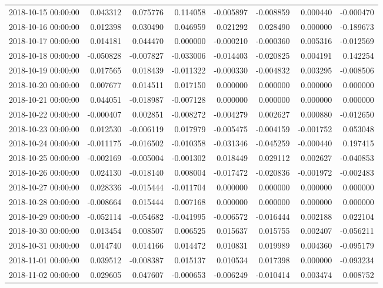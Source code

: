 \begin{tabular}{lrrrrrrr}
2018-10-15 00:00:00 & 0.043312 & 0.075776 & 0.114058 & -0.005897 & -0.008859 & 0.000440 & -0.000470 \\
2018-10-16 00:00:00 & 0.012398 & 0.030490 & 0.046959 & 0.021292 & 0.028490 & 0.000000 & -0.189673 \\
2018-10-17 00:00:00 & 0.014181 & 0.044470 & 0.000000 & -0.000210 & -0.000360 & 0.005316 & -0.012569 \\
2018-10-18 00:00:00 & -0.050828 & -0.007827 & -0.033006 & -0.014403 & -0.020825 & 0.004191 & 0.142254 \\
2018-10-19 00:00:00 & 0.017565 & 0.018439 & -0.011322 & -0.000330 & -0.004832 & 0.003295 & -0.008506 \\
2018-10-20 00:00:00 & 0.007677 & 0.014511 & 0.017150 & 0.000000 & 0.000000 & 0.000000 & 0.000000 \\
2018-10-21 00:00:00 & 0.044051 & -0.018987 & -0.007128 & 0.000000 & 0.000000 & 0.000000 & 0.000000 \\
2018-10-22 00:00:00 & -0.000407 & 0.002851 & -0.008272 & -0.004279 & 0.002627 & 0.000880 & -0.012650 \\
2018-10-23 00:00:00 & 0.012530 & -0.006119 & 0.017979 & -0.005475 & -0.004159 & -0.001752 & 0.053048 \\
2018-10-24 00:00:00 & -0.011175 & -0.016502 & -0.010358 & -0.031346 & -0.045259 & -0.000440 & 0.197415 \\
2018-10-25 00:00:00 & -0.002169 & -0.005004 & -0.001302 & 0.018449 & 0.029112 & 0.002627 & -0.040853 \\
2018-10-26 00:00:00 & 0.024130 & -0.018140 & 0.008004 & -0.017472 & -0.020836 & -0.001972 & -0.002483 \\
2018-10-27 00:00:00 & 0.028336 & -0.015444 & -0.011704 & 0.000000 & 0.000000 & 0.000000 & 0.000000 \\
2018-10-28 00:00:00 & -0.008664 & 0.015444 & 0.007168 & 0.000000 & 0.000000 & 0.000000 & 0.000000 \\
2018-10-29 00:00:00 & -0.052114 & -0.054682 & -0.041995 & -0.006572 & -0.016444 & 0.002188 & 0.022104 \\
2018-10-30 00:00:00 & 0.013454 & 0.008507 & 0.006525 & 0.015637 & 0.015755 & 0.002407 & -0.056211 \\
2018-10-31 00:00:00 & 0.014740 & 0.014166 & 0.014472 & 0.010831 & 0.019989 & 0.004360 & -0.095179 \\
2018-11-01 00:00:00 & 0.039512 & -0.008387 & 0.015137 & 0.010534 & 0.017398 & 0.000000 & -0.093234 \\
2018-11-02 00:00:00 & 0.029605 & 0.047607 & -0.000653 & -0.006249 & -0.010414 & 0.003474 & 0.008752 \\

\end{tabular}
